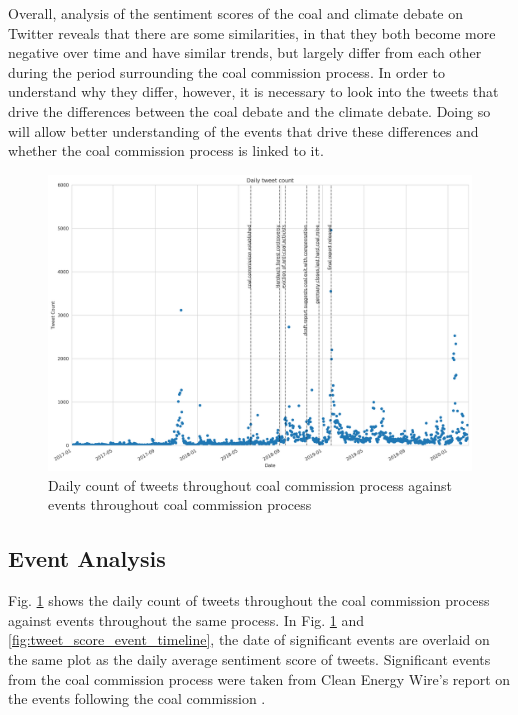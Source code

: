 \documentclass[12pt,onecolumn,twoside]{layout}
\begin{document}
Overall, analysis of the sentiment scores of the coal and climate debate on Twitter reveals that there are some similarities, in that they both become more negative over time and have similar trends, but largely differ from each other during the period surrounding the coal commission process. In order to understand why they differ, however, it is necessary to look into the tweets that drive the differences between the coal debate and the climate debate. Doing so will allow better understanding of the events that drive these differences and whether the coal commission process is linked to it.

\begin{figure}
	\begin{center}
		\includegraphics[width=\textwidth]{figures/sa_tweet_count_event_timeline3}
	\end{center}
	\caption{Daily count of tweets throughout coal commission process against events throughout coal commission process}
	\label{fig:tweet_count_event_timeline}
\end{figure}


\subsection*{Event Analysis}
Fig. \ref{fig:tweet_count_event_timeline} shows the daily count of tweets throughout the coal commission process against events throughout the same process. In Fig. \ref{fig:tweet_count_event_timeline} and \ref{fig:tweet_score_event_timeline}, the date of significant events are overlaid on the same plot as the daily average sentiment score of tweets. Significant events from the coal commission process were taken from Clean Energy Wire's report on the events following the coal commission \citep{Amelang2019}.
\end{document}
